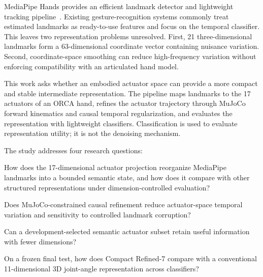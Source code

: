 \documentclass[11pt]{article}
\begin{document}
MediaPipe Hands provides an efficient landmark detector and lightweight tracking pipeline~\cite{zhang2020mediapipehands}. Existing gesture-recognition systems commonly treat estimated landmarks as ready-to-use features and focus on the temporal classifier. This leaves two representation problems unresolved. First, 21 three-dimensional landmarks form a 63-dimensional coordinate vector containing nuisance variation. Second, coordinate-space smoothing can reduce high-frequency variation without enforcing compatibility with an articulated hand model.

This work asks whether an embodied actuator space can provide a more compact and stable intermediate representation. The pipeline maps landmarks to the 17 actuators of an ORCA hand, refines the actuator trajectory through MuJoCo forward kinematics and causal temporal regularization, and evaluates the representation with lightweight classifiers. Classification is used to evaluate representation utility; it is not the denoising mechanism.

The study addresses four research questions:
\begin{description}[leftmargin=0.75in,style=nextline]
\item[RQ1] How does the 17-dimensional actuator projection reorganize MediaPipe landmarks into a bounded semantic state, and how does it compare with other structured representations under dimension-controlled evaluation?
\item[RQ2] Does MuJoCo-constrained causal refinement reduce actuator-space temporal variation and sensitivity to controlled landmark corruption?
\item[RQ3] Can a development-selected semantic actuator subset retain useful information with fewer dimensions?
\item[RQ4] On a frozen final test, how does Compact Refined-7 compare with a conventional 11-dimensional 3D joint-angle representation across classifiers?
\end{description}
\end{document}
